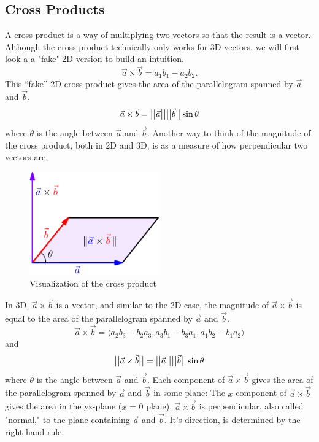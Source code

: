 \subsection{Cross Products}
\noindent
A cross product is a way of multiplying two vectors so that the result is a vector.
Although the cross product technically only works for 3D vectors, we will first look a a "fake" 2D version to build an intuition.
\begin{equation*}
	\vec{a}\times\vec{b} = a_1b_1-a_2b_2.
\end{equation*}
This ``fake'' 2D cross product gives the area of the parallelogram spanned by $\vec{a}$ and $\vec{b}$.
\begin{equation*}
	\vec{a}\times\vec{b} = \big\lvert \big\lvert \vec{a} \big\rvert \big\rvert\big\lvert \big\lvert \vec{b} \big\rvert \big\rvert\sin{\theta}
\end{equation*}
where $\theta$ is the angle between $\vec{a}$ and $\vec{b}$.
Another way to think of the magnitude of the cross product, both in 2D and 3D, is as a measure of how perpendicular two vectors are.

\begin{figure}[H]
	\centering
	\includegraphics[width=0.5\textwidth]{../common/vectorsMatrices/CrossProduct.png}
	\caption{Visualization of the cross product}
\end{figure}

\noindent
In 3D, $\vec{a}\times\vec{b}$ is a vector, and similar to the 2D case, the magnitude of $\vec{a}\times\vec{b}$ is equal to the area of the parallelogram spanned by $\vec{a}$ and $\vec{b}$.
\begin{equation*}
	\vec{a}\times\vec{b} = \langle a_2b_3-b_2a_3,a_3b_1-b_3a_1,a_1b_2-b_1a_2 \rangle
\end{equation*}
and
\begin{equation*}
	\big\lvert \big\lvert \vec{a}\times\vec{b} \big\rvert \big\rvert=\big\lvert \big\lvert \vec{a} \big\rvert \big\rvert\big\lvert \big\lvert \vec{b} \big\rvert \big\rvert\sin{\theta}
\end{equation*}
where $\theta$ is the angle between $\vec{a}$ and $\vec{b}$.
Each component of $\vec{a}\times\vec{b}$ gives the area of the parallelogram spanned by $\vec{a}$ and $\vec{b}$ in some plane:
The $x$-component of $\vec{a}\times\vec{b}$ gives the area in the yz-plane ($x$ = 0 plane).
$\vec{a}\times\vec{b}$ is perpendicular, also called "normal," to the plane containing $\vec{a}$ and $\vec{b}$. It's direction, is determined by the right hand rule.\\


